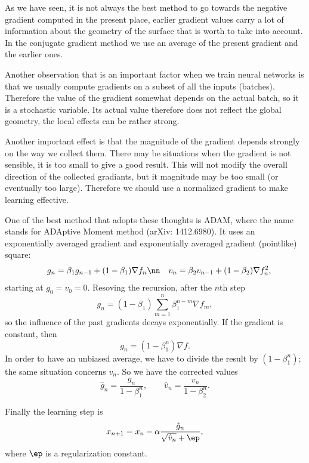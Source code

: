 \documentclass[10pt,a4paper]{article}
\begin{document}
As we have seen, it is not always the best method to go towards the negative gradient computed in the present place, earlier gradient values carry a lot of information about the geometry of the surface that is worth to take into account. In the conjugate gradient method we use an average of the present gradient and the earlier ones.

Another observation that is an important factor when we train neural networks is that we usually compute gradients on a subset of all the inputs (batches). Therefore the value of the gradient somewhat depends on the actual batch, so it is a stochastic variable. Its actual value therefore does not reflect the global geometry, the local effects can be rather strong.

Another important effect is that the magnitude of the gradient depends strongly on the way we collect them. There may be situations when the gradient is not sensible, it is too small to give a good result. This will not modify the overall direction of the collected gradiants, but it magnitude may be too small (or eventually too large). Therefore we should use a normalized gradient to make learning effective.

One of the best method that adopts these thoughts is ADAM, where the name stands for ADAptive Moment method (arXiv: 1412.6980). It uses an exponentially averaged gradient and exponentially averaged gradient (pointlike) square:
\begin{eqnarray}
  && g_n = \beta_1 g_{n-1} + (1-\beta_1) \nabla f_n\nn
  && v_n = \beta_2 v_{n-1} + (1-\beta_2) \nabla f_n^2,
\end{eqnarray}
starting at $g_0=v_0=0$. Resoving the recursion, after the $n$th step
\begin{equation}
  g_n = (1-\beta_1)\sum_{m=1}^n \beta_1^{n-m} \nabla f_m,
\end{equation}
so the influence of the past gradients decays exponentially. If the gradient is constant, then
\begin{equation}
  g_n = (1-\beta_1^n) \nabla f.
\end{equation}
In order to have an unbiased average, we have to divide the result by $(1-\beta_1^n)$; the same situation concerns $v_n$. So we have the corrected values
\begin{equation}
  \hat g_n = \frac{g_n}{1-\beta_1^n},\qquad
  \hat v_n = \frac{v_n}{1-\beta_2^n}.
\end{equation}


Finally the learning step is
\begin{equation}
  x_{n+1} = x_n - \alpha \frac{\hat g_n}{\sqrt{\hat v_n}+\ep},
\end{equation}
where $\ep$ is a regularization constant.
\end{document}

